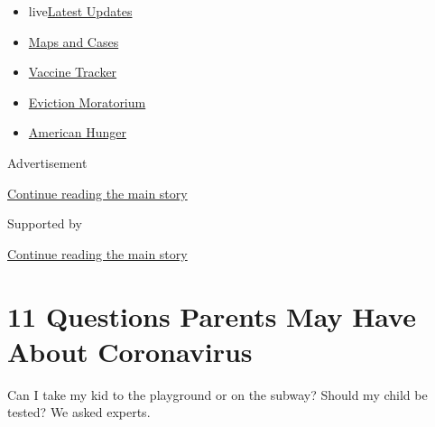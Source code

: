 \begin{itemize}
\tightlist
\item
  live\href{https://www.nytimes3xbfgragh.onion/2020/09/05/world/coronavirus-covid.html?name=styln-coronavirus-national\&region=TOP_BANNER\&block=storyline_menu_recirc\&action=click\&pgtype=Article\&impression_id=50c75391-efb9-11ea-9f2d-2b6e424d6802\&variant=undefined}{Latest
  Updates}
\item
  \href{https://www.nytimes3xbfgragh.onion/interactive/2020/us/coronavirus-us-cases.html?name=styln-coronavirus-national\&region=TOP_BANNER\&block=storyline_menu_recirc\&action=click\&pgtype=Article\&impression_id=50c75392-efb9-11ea-9f2d-2b6e424d6802\&variant=undefined}{Maps
  and Cases}
\item
  \href{https://www.nytimes3xbfgragh.onion/interactive/2020/science/coronavirus-vaccine-tracker.html?name=styln-coronavirus-national\&region=TOP_BANNER\&block=storyline_menu_recirc\&action=click\&pgtype=Article\&impression_id=50c75393-efb9-11ea-9f2d-2b6e424d6802\&variant=undefined}{Vaccine
  Tracker}
\item
  \href{https://www.nytimes3xbfgragh.onion/2020/09/02/your-money/eviction-moratorium-covid.html?name=styln-coronavirus-national\&region=TOP_BANNER\&block=storyline_menu_recirc\&action=click\&pgtype=Article\&impression_id=50c75394-efb9-11ea-9f2d-2b6e424d6802\&variant=undefined}{Eviction
  Moratorium}
\item
  \href{https://www.nytimes3xbfgragh.onion/interactive/2020/09/02/magazine/food-insecurity-hunger-us.html?name=styln-coronavirus-national\&region=TOP_BANNER\&block=storyline_menu_recirc\&action=click\&pgtype=Article\&impression_id=50c75395-efb9-11ea-9f2d-2b6e424d6802\&variant=undefined}{American
  Hunger}
\end{itemize}

Advertisement

\protect\hyperlink{after-top}{Continue reading the main story}

Supported by

\protect\hyperlink{after-sponsor}{Continue reading the main story}

\hypertarget{11-questions-parents-may-have-about-coronavirus}{%
\section{11 Questions Parents May Have About
Coronavirus}\label{11-questions-parents-may-have-about-coronavirus}}

Can I take my kid to the playground or on the subway? Should my child be
tested? We asked experts.

